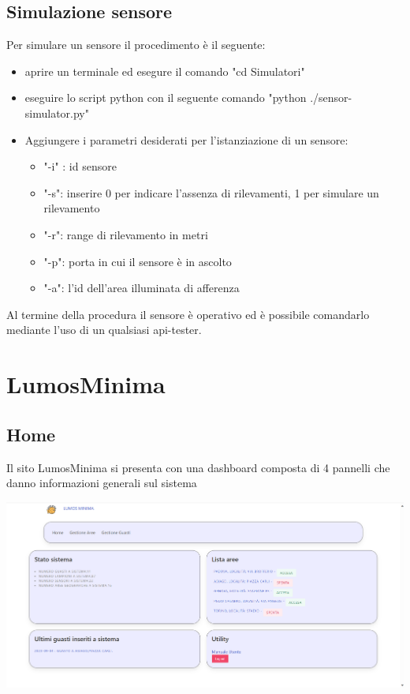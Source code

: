 \documentclass[9pt]{article}
\begin{document}
\subsection{Simulazione sensore}
Per simulare un sensore il procedimento è il seguente:
\begin{itemize}
	\item aprire un terminale ed esegure il comando "cd Simulatori"
	\item eseguire lo script python con il seguente comando "python ./sensor-simulator.py"
	\item Aggiungere i parametri desiderati per l'istanziazione di un sensore:
    \begin{itemize}
        \item "-i" : id sensore
        \item "-s": inserire 0 per indicare l'assenza di rilevamenti, 1 per simulare un rilevamento
        \item "-r": range di rilevamento in metri
        \item "-p":  porta in cui il sensore è in ascolto
        \item "-a": l'id dell'area illuminata di afferenza
    \end{itemize}
\end{itemize}
Al termine della procedura il sensore è operativo ed è possibile comandarlo mediante l'uso di un qualsiasi api-tester.
\section{LumosMinima}
\subsection{Home}
Il sito LumosMinima si presenta con una dashboard composta di 4 pannelli che danno informazioni generali
sul sistema

\begin{center}
	\includegraphics[scale=0.3]{LumosMinimaHome.png}
\end{center}
\end{document}
